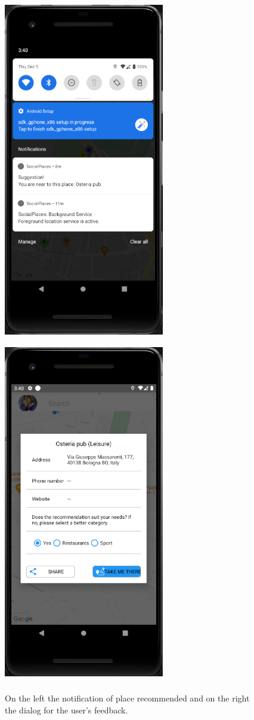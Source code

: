 \documentclass[../../main]{subfiles}
\begin{document}
\begin{figure}[H]
    \centering
    \includegraphics[width=70mm,height=150mm]{images/app/notification/recommendation/recommendation_request.png}
    \includegraphics[width=70mm,height=150mm]{images/app/notification/recommendation/user_feedback.png}
    \caption{On the left the notification of place recommended and on the right the dialog for the user's feedback.}
\end{figure}
\end{document}
